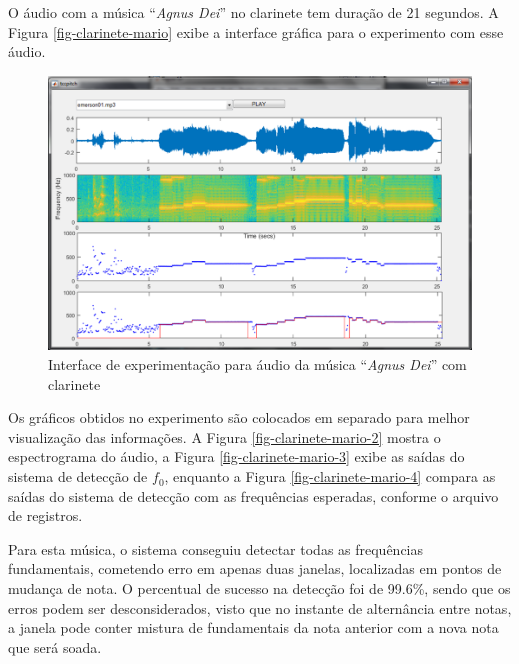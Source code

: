 O áudio com a música ``\textit{Agnus Dei}'' no clarinete tem duração de 21 segundos. A Figura \ref{fig-clarinete-mario} exibe a interface gráfica para o experimento com esse áudio.

\begin{figure}
	\centering
	\includegraphics[width=0.75\linewidth]{pasta1_figuras/clarinete-agnusdei.png}
	\caption{Interface de experimentação para áudio da música ``\textit{Agnus Dei}'' com clarinete}
	\label{fig-clarinete-agnusdei}
\end{figure}

Os gráficos obtidos no experimento são colocados em separado para melhor visualização das informações. A Figura \ref{fig-clarinete-mario-2} mostra o espectrograma do áudio, a Figura \ref{fig-clarinete-mario-3} exibe as saídas do sistema de detecção de $f_0$, enquanto a Figura \ref{fig-clarinete-mario-4} compara as saídas do sistema de detecção com as frequências esperadas, conforme o arquivo de registros.


Para esta música, o sistema conseguiu detectar todas as frequências fundamentais, cometendo erro em apenas duas janelas, localizadas em pontos de mudança de nota. O percentual de sucesso na detecção foi de 99.6\%, sendo que os erros podem ser desconsiderados, visto que no instante de alternância entre notas, a janela pode conter mistura de fundamentais da nota anterior com a nova nota que será soada.

